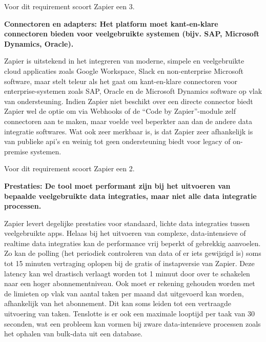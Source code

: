 Voor dit requirement scoort Zapier een 3.


\vspace{\baselineskip}

\textbf{Connectoren en adapters: Het platform moet kant-en-klare connectoren bieden voor veelgebruikte systemen (bijv. SAP, Microsoft Dynamics, Oracle).}
\vspace{\baselineskip}

Zapier is uitstekend in het integreren van moderne, simpele en veelgebruikte cloud applicaties zoals Google Workspace, Slack en non-enterprise Microsoft software, maar stelt teleur als het gaat om kant-en-klare connectoren voor enterprise-systemen zoals SAP, Oracle en de Microsoft Dynamics software op vlak van ondersteuning. Indien Zapier niet beschikt over een directe connector biedt Zapier wel de optie om via Webhooks of de “Code by Zapier”-module zelf connectoren aan te maken, maar voelde veel beperkter aan dan de andere data integratie softwares. Wat ook zeer merkbaar is, is dat Zapier zeer afhankelijk is van publieke api’s en weinig tot geen ondersteuning biedt voor legacy of on-premise systemen.


Voor dit requirement scoort Zapier een 2.


\vspace{\baselineskip}

\textbf{Prestaties: De tool moet performant zijn bij het uitvoeren van bepaalde veelgebruikte data integraties, maar niet alle data integratie processen.}

\vspace{\baselineskip}

Zapier levert degelijke prestaties voor standaard, lichte data integraties tussen veelgebruikte apps. Helaas bij het uitvoeren van complexe, data-intensieve of realtime data integraties kan de performance vrij beperkt of gebrekkig aanvoelen. Zo kan de polling (het periodiek controleren van data of er iets gewijzigd is) soms tot 15 minuten vertraging oplopen bij de gratis of instapversie van Zapier. Deze latency kan wel drastisch verlaagt worden tot 1 minuut door over te schakelen naar een hoger abonnementniveau. Ook moet er rekening gehouden worden met de limieten op vlak van aantal taken per maand dat uitgevoerd kan worden, afhankelijk van het abonnement. Dit kan soms leiden tot een vertraagde uitvoering van taken. Tenslotte is er ook een maximale looptijd per taak van 30 seconden, wat een probleem kan vormen bij zware data-intensieve processen zoals het ophalen van bulk-data uit een database. 



